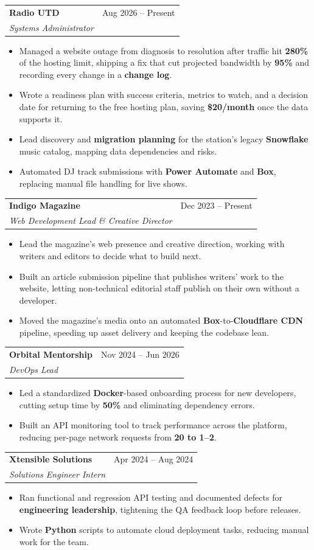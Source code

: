 \documentclass[letterpaper,11pt]{article}
\makeatletter
\newcommand{\resumeItem}[1]{\item\small{{#1 \vspace{-2pt}}}}
\newcommand{\resumeSubheading}[4]{
  \vspace{-2pt}\item
    \begin{tabular*}{0.97\textwidth}[t]{l@{\extracolsep{\fill}}r}
      \textbf{#1} & #2 \\
      \textit{\small#3} & \textit{\small #4} \\
    \end{tabular*}\vspace{-7pt}
}
\newcommand{\resumeItemListStart}{\begin{itemize}}
\newcommand{\resumeItemListEnd}{\end{itemize}\vspace{-5pt}}
\makeatother
\begin{document}
    \resumeSubheading
      {Radio UTD}{Aug 2026 -- Present}
      {Systems Administrator}{}
      \resumeItemListStart
        \resumeItem{Managed a website outage from diagnosis to resolution after traffic hit \textbf{280\%} of the hosting limit, shipping a fix that cut projected bandwidth by \textbf{95\%} and recording every change in a \textbf{change log}.}
        \resumeItem{Wrote a readiness plan with success criteria, metrics to watch, and a decision date for returning to the free hosting plan, saving \textbf{\$20/month} once the data supports it.}
        \resumeItem{Lead discovery and \textbf{migration planning} for the station's legacy \textbf{Snowflake} music catalog, mapping data dependencies and risks.}
        \resumeItem{Automated DJ track submissions with \textbf{Power Automate} and \textbf{Box}, replacing manual file handling for live shows.}
      \resumeItemListEnd

    \resumeSubheading
      {Indigo Magazine}{Dec 2023 -- Present}
      {Web Development Lead \& Creative Director}{}
      \resumeItemListStart
        \resumeItem{Lead the magazine's web presence and creative direction, working with writers and editors to decide what to build next.}
        \resumeItem{Built an article submission pipeline that publishes writers' work to the website, letting non-technical editorial staff publish on their own without a developer.}
        \resumeItem{Moved the magazine's media onto an automated \textbf{Box}-to-\textbf{Cloudflare CDN} pipeline, speeding up asset delivery and keeping the codebase lean.}
      \resumeItemListEnd

    \resumeSubheading
      {Orbital Mentorship}{Nov 2024 -- Jun 2026}
      {DevOps Lead}{}
      \resumeItemListStart
        \resumeItem{Led a standardized \textbf{Docker}-based onboarding process for new developers, cutting setup time by \textbf{50\%} and eliminating dependency errors.}
        \resumeItem{Built an API monitoring tool to track performance across the platform, reducing per-page network requests from \textbf{20 to 1--2}.}
      \resumeItemListEnd

    \resumeSubheading
      {Xtensible Solutions}{Apr 2024 -- Aug 2024}
      {Solutions Engineer Intern}{}
      \resumeItemListStart
        \resumeItem{Ran functional and regression API testing and documented defects for \textbf{engineering leadership}, tightening the QA feedback loop before releases.}
        \resumeItem{Wrote \textbf{Python} scripts to automate cloud deployment tasks, reducing manual work for the team.}
      \resumeItemListEnd
\end{document}
